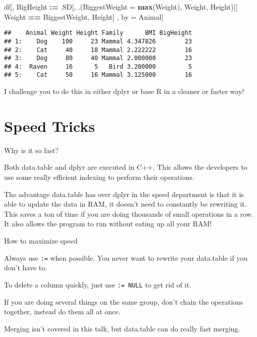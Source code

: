 \documentclass[ignorenonframetext,]{beamer}
\newenvironment{Shaded}{\begin{snugshade}}{\end{snugshade}}
\newcommand{\DataTypeTok}[1]{\textcolor[rgb]{0.13,0.29,0.53}{#1}}
\newcommand{\ErrorTok}[1]{\textcolor[rgb]{0.64,0.00,0.00}{\textbf{#1}}}
\newcommand{\KeywordTok}[1]{\textcolor[rgb]{0.13,0.29,0.53}{\textbf{#1}}}
\newcommand{\NormalTok}[1]{#1}
\newcommand{\OperatorTok}[1]{\textcolor[rgb]{0.81,0.36,0.00}{\textbf{#1}}}
\newcommand{\StringTok}[1]{\textcolor[rgb]{0.31,0.60,0.02}{#1}}
\begin{document}
\begin{frame}[fragile]

\begin{Shaded}
\begin{Highlighting}[]
\NormalTok{df[, BigHeight }\OperatorTok{:}\ErrorTok{=}\StringTok{ }\NormalTok{.SD[, .(}\DataTypeTok{BiggestWeight =} \KeywordTok{max}\NormalTok{(Weight),}
\NormalTok{                           Weight,}
\NormalTok{                           Height)][}
\NormalTok{                       Weight }\OperatorTok{==}\StringTok{ }\NormalTok{BiggestWeight, Height]}
\NormalTok{   , by =}\StringTok{ }\NormalTok{Animal]}
\end{Highlighting}
\end{Shaded}

\begin{verbatim}
##    Animal Weight Height Family      BMI BigHeight
## 1:    Dog    100     23 Mammal 4.347826        23
## 2:    Cat     40     18 Mammal 2.222222        16
## 3:    Dog     80     40 Mammal 2.000000        23
## 4:  Raven     16      5   Bird 3.200000         5
## 5:    Cat     50     16 Mammal 3.125000        16
\end{verbatim}

I challenge you to do this in either dplyr or base R in a cleaner or
faster way!

\end{frame}

\hypertarget{speed-tricks}{%
\section{Speed Tricks}\label{speed-tricks}}

\begin{frame}{Why is it so fast?}
\protect\hypertarget{why-is-it-so-fast}{}

Both data.table and dplyr are executed in C++. This allows the
developers to use some really efficient indexing to perform their
operations.

The advantage data.table has over dplyr in the speed department is that
it is able to update the data in RAM, it doesn't need to constantly be
rewriting it. This saves a ton of time if you are doing thousands of
small operations in a row. It also allows the program to run without
eating up all your RAM!

\end{frame}

\begin{frame}[fragile]{How to maximize speed}
\protect\hypertarget{how-to-maximize-speed}{}

Always use \texttt{:=} when possible. You never want to rewrite your
data.table if you don't have to.

To delete a column quickly, just use \texttt{:=\ NULL} to get rid of it.

If you are doing several things on the same group, don't chain the
operations together, instead do them all at once.

Merging isn't covered in this talk, but data.table can do really fast
merging.

\end{frame}
\end{document}

